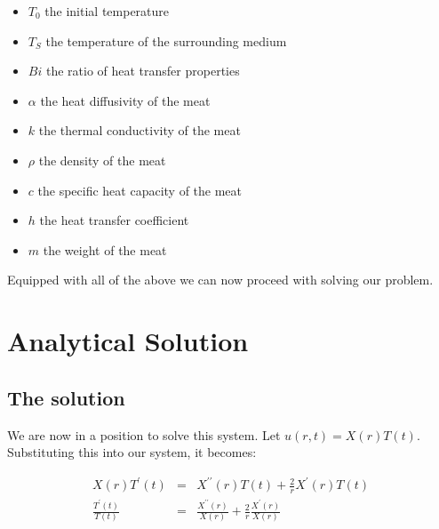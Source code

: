 \documentclass{report}
\begin{document}
\begin{itemize}

\item $T_0$    \tab the initial temperature

\item $T_S$    \tab the temperature of the surrounding medium 

\item $Bi$     \tab the ratio of heat transfer properties 

\item $\alpha$ \tab the heat diffusivity of the meat

\item $k$      \tab the thermal conductivity of the meat

\item $\rho$   \tab the density of the meat

\item $c$      \tab the specific heat capacity of the meat

\item $h$      \tab the heat transfer coefficient

\item $m$      \tab the weight of the meat

\end{itemize}\medskip

Equipped with all of the above we can now proceed with solving our problem.




















\chapter{Analytical Solution}



\section{The solution}

We are now in a position to solve this system. Let $u(r, t) = X(r)T(t)$. Substituting this into our system, 
it becomes:\bigskip

\begin{eqnarray*} 
X(r)T^{\prime}(t) & = & X^{\prime\prime}(r)T(t) + \frac{2}{r}X^{\prime}(r)T(t) \\
\frac{T^{\prime}(t)}{T(t)} & = & \frac{X^{\prime\prime}(r)}{X(r)} + \frac{2}{r}\frac{X^{\prime}(r)}{X(r)}
\end{eqnarray*}\medskip
\end{document}
